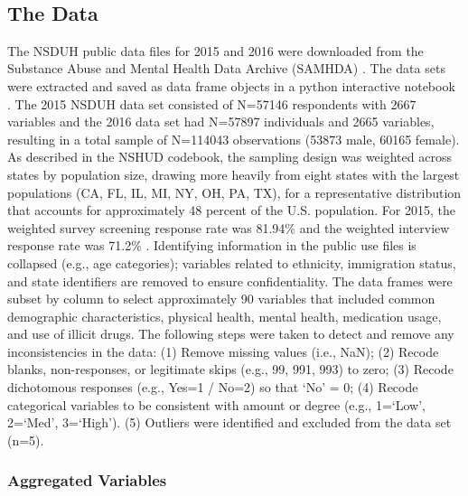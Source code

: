 \\\documentclass[sigconf]{acmart}
\begin{document}
\subsection{The Data}

The NSDUH public data files for 2015 and 2016 were downloaded from the 
Substance Abuse and Mental Health Data Archive (SAMHDA) \cite{samhsa18}. 
The data sets were extracted and saved as data frame objects in a python 
interactive notebook \cite{mckinney17, vanderplas17}. The 2015 NSDUH data set 
consisted of N=57146 respondents with 2667 variables and the 2016 data set had 
N=57897 individuals and 2665 variables, resulting in a total sample of N=114043 
observations (53873 male, 60165 female). As described in the NSHUD codebook, 
the sampling design was weighted across states by population size, drawing more 
heavily from eight states with the largest populations (CA, FL, IL, MI, NY, OH, 
PA, TX), for a representative distribution that accounts for approximately 
48 percent of the U.S. population. For 2015, the weighted survey screening 
response rate  was 81.94\% and the weighted interview response rate was 71.2\% 
\cite{samhsa18}. Identifying information in the public use files is collapsed 
(e.g., age categories); variables related to ethnicity, immigration status, and 
state identifiers are removed to ensure confidentiality. The data frames were 
subset by column to select approximately 90 variables that included common 
demographic characteristics, physical health, mental health, medication usage, 
and use of illicit drugs. The following steps were taken to detect and remove 
any inconsistencies in the data: (1) Remove missing values (i.e., NaN); 
(2) Recode blanks, non-responses, or legitimate skips (e.g., 99, 991, 993) to 
zero; (3) Recode dichotomous responses (e.g., Yes=1 / No=2) so that 
`No' = 0; (4) Recode categorical variables to be consistent with amount or 
degree  (e.g., 1=`Low', 2=`Med', 3=`High'). (5) Outliers were identified 
and excluded from the data set (n=5).


\subsubsection{Aggregated Variables}
\end{document}
